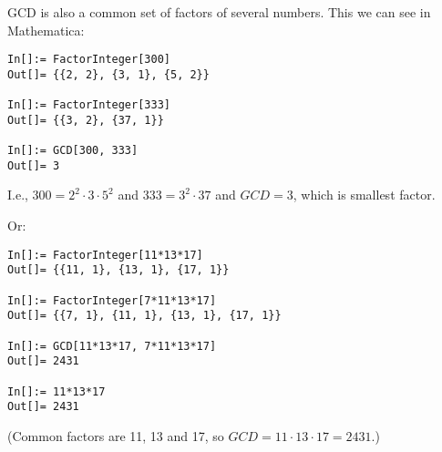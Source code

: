 GCD is also a common set of factors of several numbers.
This we can see in Mathematica:

\begin{lstlisting}
In[]:= FactorInteger[300]
Out[]= {{2, 2}, {3, 1}, {5, 2}}

In[]:= FactorInteger[333]
Out[]= {{3, 2}, {37, 1}}

In[]:= GCD[300, 333]
Out[]= 3
\end{lstlisting}

I.e., $300=2^2 \cdot 3 \cdot 5^2$ and $333=3^2 \cdot 37$ and $GCD=3$, which is smallest factor.

Or:

\begin{lstlisting}
In[]:= FactorInteger[11*13*17]
Out[]= {{11, 1}, {13, 1}, {17, 1}}

In[]:= FactorInteger[7*11*13*17]
Out[]= {{7, 1}, {11, 1}, {13, 1}, {17, 1}}

In[]:= GCD[11*13*17, 7*11*13*17]
Out[]= 2431

In[]:= 11*13*17
Out[]= 2431
\end{lstlisting}

(Common factors are 11, 13 and 17, so $GCD = 11 \cdot 13 \cdot 17 = 2431$.)

